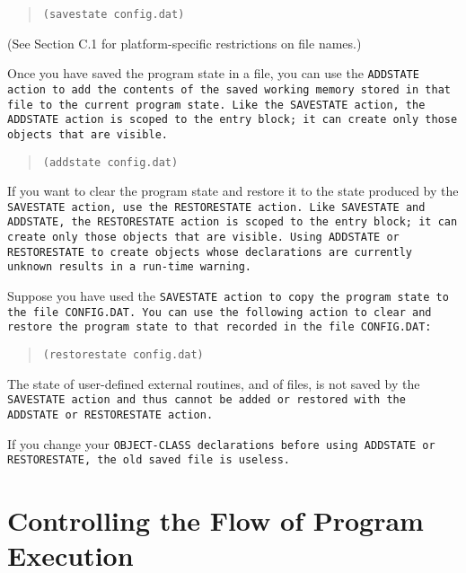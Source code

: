 \begin{quote}
\begin{verbatim}
(savestate config.dat)
\end{verbatim}
\end{quote}

(See Section C.1 for platform-specific restrictions on file names.)

Once you have saved the program state in a file, you can use the
\tt{ADDSTATE} action to add the contents of the saved working memory
stored in that file to the current program state. Like the
\tt{SAVESTATE} action, the \tt{ADDSTATE} action is scoped to the entry
block; it can create only those objects that are visible.

\begin{quote}
\begin{verbatim}
(addstate config.dat)
\end{verbatim}
\end{quote}

If you want to clear the program state and restore it to the state
produced by the \tt{SAVESTATE} action, use the \tt{RESTORESTATE}
action.  Like \tt{SAVESTATE} and \tt{ADDSTATE}, the \tt{RESTORESTATE}
action is scoped to the entry block; it can create only those objects
that are visible.  Using \tt{ADDSTATE} or \tt{RESTORESTATE} to create
objects whose declarations are currently unknown results in a run-time
warning.

Suppose you have used the \tt{SAVESTATE} action to copy the program
state to the file \tt{CONFIG.DAT}.  You can use the following action
to clear and restore the program state to that recorded in the file
\tt{CONFIG.DAT}:

\begin{quote}
\begin{verbatim}
(restorestate config.dat)
\end{verbatim}
\end{quote}

The state of user-defined external routines, and of files, is not
saved by the \tt{SAVESTATE} action and thus cannot be added or
restored with the \tt{ADDSTATE} or \tt{RESTORESTATE} action.

If you change your \tt{OBJECT-CLASS} declarations before using
\tt{ADDSTATE} or \tt{RESTORESTATE}, the old saved file is useless.

\section{Controlling the Flow of Program Execution}

